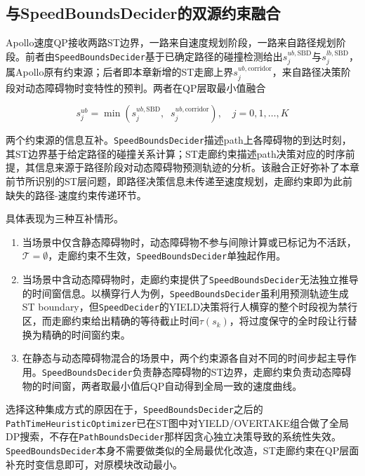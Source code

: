 \subsection{与SpeedBoundsDecider的双源约束融合}
Apollo速度QP接收两路ST边界，一路来自速度规划阶段，一路来自路径规划阶段。前者由\texttt{SpeedBoundsDecider}基于已确定路径的碰撞检测给出$s_j^{ub,\text{SBD}}$与$s_j^{lb,\text{SBD}}$，属Apollo原有约束源；后者即本章新增的ST走廊上界$s_j^{ub,\text{corridor}}$，来自路径决策阶段对动态障碍物时变特性的预判。两者在QP层取最小值融合

\begin{equation}
    s_j^{ub} = \min\!\left(s_j^{ub,\text{SBD}},\;\; s_j^{ub,\text{corridor}}\right), \quad j = 0, 1, \ldots, K
    \label{eq:dual_source}
\end{equation}

两个约束源的信息互补。\texttt{SpeedBoundsDecider}描述path上各障碍物的到达时刻，其ST边界基于给定路径的碰撞关系计算；ST走廊约束描述path决策对应的时序前提，其信息来源于路径阶段对动态障碍物预测轨迹的分析。该融合正好弥补了本章前节所识别的ST层问题，即路径决策信息未传递至速度规划，走廊约束即为此前缺失的路径-速度约束传递环节。

具体表现为三种互补情形。
\begin{enumerate}
\item 当场景中仅含静态障碍物时，动态障碍物不参与间隙计算或已标记为不活跃，$\mathcal{T} = \emptyset$，走廊约束不生效，\texttt{SpeedBoundsDecider}单独起作用。

\item 当场景中含动态障碍物时，走廊约束提供了\texttt{SpeedBoundsDecider}无法独立推导的时间窗信息。以横穿行人为例，\texttt{SpeedBoundsDecider}虽利用预测轨迹生成ST boundary，但\texttt{SpeedDecider}的YIELD决策将行人横穿的整个时段视为禁行区，而走廊约束给出精确的等待截止时间$\tau(s_k)$，将过度保守的全时段让行替换为精确的时间窗约束。

\item 在静态与动态障碍物混合的场景中，两个约束源各自对不同的时间步起主导作用。\texttt{SpeedBoundsDecider}负责静态障碍物的ST边界，走廊约束负责动态障碍物的时间窗，两者取最小值后QP自动得到全局一致的速度曲线。
\end{enumerate}

选择这种集成方式的原因在于，\texttt{SpeedBoundsDecider}之后的\texttt{PathTimeHeuristicOptimizer}已在ST图中对YIELD/OVERTAKE组合做了全局DP搜索，不存在\texttt{PathBoundsDecider}那样因贪心独立决策导致的系统性失效。\texttt{SpeedBoundsDecider}本身不需要做类似的全局最优化改造，ST走廊约束在QP层面补充时变信息即可，对原模块改动最小。


